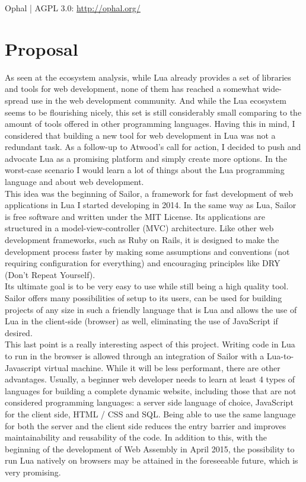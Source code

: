 \documentclass{article}
\begin{document}
Ophal | AGPL 3.0: \url{http://ophal.org/} \\

	\newpage
\section{Proposal}

As seen at the ecosystem analysis, while Lua already provides a set of libraries and tools for web development, none of them has reached a somewhat wide-spread use in the web development community. And while the Lua ecosystem seems to be flourishing nicely, this set is still considerably small comparing to the amount of tools offered in other programming languages. Having this in mind, I considered that building a new tool for web development in Lua was not a redundant task. As a follow-up to Atwood's call for action, I decided to push and advocate Lua as a promising platform and simply create more options. In the worst-case scenario I would learn a lot of things about the Lua programming language and about web development. \\

This idea was the beginning of Sailor, a framework for fast development of web applications in Lua I started developing in 2014. In the same way as Lua, Sailor is free software and written under the MIT License. Its applications are structured in a model-view-controller (MVC) architecture. Like other web development frameworks, such as Ruby on Rails, it is designed to make the development process faster by making some assumptions and conventions (not requiring configuration for everything) and encouraging principles like DRY (Don't Repeat Yourself).\\

Its ultimate goal is to be very easy to use while still being a high quality tool. Sailor offers many possibilities of setup to its users, can be used for building projects of any size in such a friendly language that is Lua and allows the use of Lua in the client-side (browser) as well, eliminating the use of JavaScript if desired.\\

This last point is a really interesting aspect of this project. Writing code in Lua to run in the browser is allowed through an integration of Sailor with a Lua-to-Javascript virtual machine. While it will be less performant, there are other advantages. Usually, a beginner web developer needs to learn at least 4 types of languages for building a complete dynamic website, including those that are not considered programming languages: a server side language of choice, JavaScript for the client side, HTML / CSS and SQL. Being able to use the same language for both the server and the client side reduces the entry barrier and improves maintainability and reusability of the code. In addition to this, with the beginning of the development of Web Assembly\autocite{webassembly} in April 2015, the possibility to run Lua natively on browsers may be attained in the foreseeable future, which is very promising.\\
\end{document}

